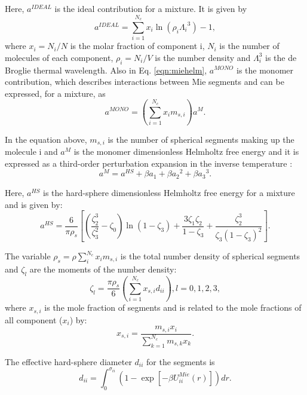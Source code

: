 	Here, $a^{IDEAL}$ is the ideal contribution for a mixture. It is given by
	\begin{equation}
	a^{IDEAL} = \sum_{i=1}^{N_{c}} x_{i}\ln{(\rho_{i}{\Lambda_{i}}^3)} -1 ,
	\label{eqn:aideal}
	\end{equation}
	where $x_{i}=N_{i}/N$ is the molar fraction of component i, $N_{i}$ is the number of molecules of each component, $\rho_{i}=N_{i}/V$ is the number density and $\Lambda_{i}^3$ is the de Broglie thermal wavelength. Also in Eq. \ref{eqn:miehelm}, $a^{MONO}$ is the monomer contribution, which  describes interactions between Mie segments and can be expressed, for a mixture, as
	\begin{equation}
	a^{MONO} = \left(\sum_{i=1}^{N_{c}} x_{i}m_{s,i} \right)a^{M} .
	\label{eqn:amonomer}
	\end{equation}
	
	In the equation above, $m_{s,i}$ is the number of spherical segments making up the molecule i and $a^{M}$  is the monomer dimensionless Helmholtz free energy and it is expressed as a third-order perturbation expansion in the inverse temperature \cite{bh1976}:
	\begin{equation}
	a^{M} = a^{HS}+\beta{a_{1}}+\beta{a_{2}}^2+\beta{a_{3}}^3 . 
	\label{eqn:aM}
	\end{equation}
	
	 Here, $a^{HS}$ is the hard-sphere dimensionless Helmholtz free energy for a mixture and is given by:
	\begin{equation}
	a^{HS} = \frac{6}{\pi\rho_{s}}\left[\left(\frac{\zeta^3_2}{\zeta^2_3}-\zeta_0 \right)\ln(1-\zeta_3)+\frac{3\zeta_{1}\zeta_{2}}{1-\zeta_3}+ \frac{\zeta^3_2}{\zeta_{3}(1-\zeta_3)^2}\right] .
	\label{eqn:hs}
	\end{equation}
	
	The variable $\rho_{s}=\rho\sum_{i}^{N_c} x_{i}m_{s,i}$ is the total number density of spherical segments and $\zeta_l$ are the moments of the number density:
	\begin{equation}
	\zeta_l = \frac{\pi\rho_s}{6}\left(\sum_{i=1}^{N_c} x_{s,i}d_{ii} \right), l = 0,1,2,3 ,
	\label{eqn:zetal}
	\end{equation}
	where $x_{s,i}$ is the mole fraction of segments and is related to the mole fractions of all component ($x_i$) by:
	\begin{equation}
	x_{s,i} = \frac{m_{s,i}x_i}{\sum_{k=1}^{N_c} m_{s,k}x_{k} } .
	\label{eqn:xsi}
	\end{equation}
	
	
	The effective hard-sphere diameter $d_{ii}$ for the segments is
	\begin{equation}
	d_{ii} =\int_{0}^{\sigma_{ii}} \left ( 1 - \exp \left [-\beta U^{Mie}_{ii}(r) \right ] \right ) dr .
	\label{eqn:diameter}
	\end{equation}
	
